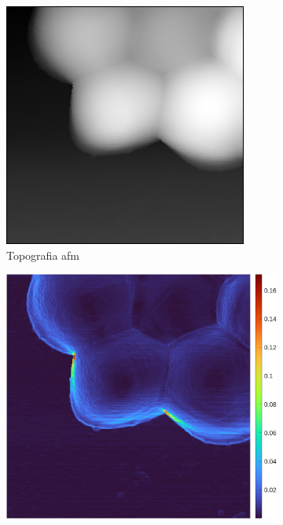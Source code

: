 \documentclass[../main.tex]{subfiles}
\begin{document}
\begin{figure}[ht]
	\centering
	\begin{subfigure}{0.4\linewidth}
		\includegraphics[keepaspectratio, width=\linewidth]{images/sa_zoom_z.png}
		\caption{Topografia \acrshort{afm}}
	\end{subfigure}\hspace{12pt}
	\begin{subfigure}{0.4425\linewidth}
		\includegraphics[keepaspectratio, width=\linewidth]{images/local_std_z.png}

\end{subfigure}
\end{figure}
\end{document}
